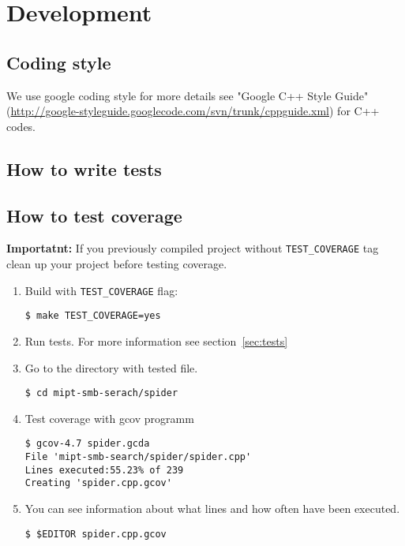 \chapter{Development}

\section{Coding style}

We use google coding style for more details see "Google C++ Style Guide" (\url{http://google-styleguide.googlecode.com/svn/trunk/cppguide.xml}) for C++ codes.

\section{How to write tests}

\section{How to test coverage}

\textbf{Importatnt:} If you previously compiled project without \texttt{TEST\_COVERAGE} tag clean up your project before testing coverage.

\begin{enumerate}

\item Build with \texttt{TEST\_COVERAGE} flag:
\begin{lstlisting}
$ make TEST_COVERAGE=yes
\end{lstlisting}

\item Run tests. For more information see section~\ref{sec:tests}

\item Go to the directory with tested file.
\begin{lstlisting}
$ cd mipt-smb-serach/spider
\end{lstlisting}

\item Test coverage with gcov programm
\begin{lstlisting}
$ gcov-4.7 spider.gcda
File 'mipt-smb-search/spider/spider.cpp'
Lines executed:55.23% of 239
Creating 'spider.cpp.gcov'
\end{lstlisting}

\item You can see information about what lines and how often have been executed.
\begin{lstlisting}
$ $EDITOR spider.cpp.gcov
\end{lstlisting}

\end{enumerate}

